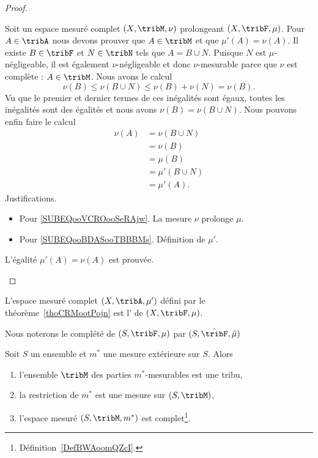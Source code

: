 \begin{proof}
\begin{subproof}
		Soit un espace mesuré complet \( (X,\tribM,\nu)\) prolongeant \( (X,\tribF,\mu)\). Pour \( A\in\tribA\) nous devons prouver que \( A\in\tribM\) et que \( \mu'(A)=\nu(A)\). Il existe \( B\in\tribF\) et \( N\in\tribN\) tels que \( A=B\cup N\). Puisque \( N\) est \( \mu\)-négligeable, il est également \( \nu\)-négligeable et donc \( \nu\)-mesurable parce que \(\nu\) est complète : \( A\in\tribM\). Nous avons le calcul
		\begin{equation}
			\nu(B)\leq\nu(B\cup N)\leq \nu(B)+\nu(N)=\nu(B).
		\end{equation}
		Vu que le premier et dernier termes de ces inégalités sont égaux, toutes les inégalités sont des égalités et nous avons \( \nu(B)=\nu(B\cup N)\). Nous pouvons enfin faire le calcul
		\begin{subequations}
			\begin{align}
				\nu(A) & =\nu(B\cup N)                              \\
				       & =\nu(B)                                    \\
				       & =\mu(B)        \label{SUBEQooVCROooSeRAjw} \\
				       & =\mu'(B\cup N) \label{SUBEQooBDASooTBBBMs} \\
				       & =\mu'(A).
			\end{align}
		\end{subequations}
		Justifications.
		\begin{itemize}
			\item Pour \eqref{SUBEQooVCROooSeRAjw}. La mesure \( \nu\) prolonge \( \mu\).
			\item Pour \eqref{SUBEQooBDASooTBBBMs}. Définition de \( \mu'\).
		\end{itemize}
		L'égalité \( \mu'(A)=\nu(A)\) est prouvée.
	\end{subproof}
\end{proof}

\begin{definition}
	L'espace mesuré complet \( (X,\tribA,\mu')\) défini par le théorème~\ref{thoCRMootPojn} est l' de \( (X,\tribF,\mu)\).

	Nous noterons le complété de \( (S,\tribF,\mu)\) par \( (S,\hat\tribF,\hat \mu)\)
\end{definition}

\begin{theorem}        \label{ThoUUIooaNljH}
	Soit \( S\) un ensemble et \( m^*\) une mesure extérieure sur \( S\). Alors
	\begin{enumerate}
		\item   \label{RPPooHSWWsi}
		      l'ensemble \( \tribM\) des parties \( m^*\)-mesurables est une tribu,
		\item
		      la restriction de \( m^*\) est une mesure sur \( (S,\tribM)\),
		\item
		      l'espace mesuré \( (S,\tribM,m^*)\) est complet\footnote{Définition~\ref{DefBWAoomQZcI}.}.
	\end{enumerate}
\end{theorem}

